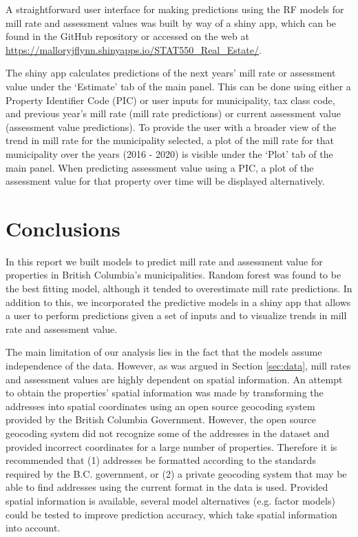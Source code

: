 \documentclass{article}
\begin{document}
A straightforward user interface for making predictions using the RF models for mill rate and assessment values was built by way of a shiny app, which can be found in the GitHub repository \citep{gitrepo} or accessed on the web at {\color{blue} \underline{\url{https://malloryjflynn.shinyapps.io/STAT550_Real_Estate/}}}. 

The shiny app calculates predictions of the next years' mill rate or assessment value under the `Estimate' tab of the main panel.  This can be done using either a Property Identifier Code (PIC) or user inputs for municipality, tax class code, and previous year's mill rate (mill rate predictions) or current assessment value (assessment value predictions).  To provide the user with a broader view of the trend in mill rate for the municipality selected, a plot of the mill rate for that municipality over the years (2016 - 2020) is visible under the `Plot' tab of the main panel.  When predicting assessment value using a PIC, a plot of the assessment value for that property over time will be displayed alternatively.


\section{Conclusions} \label{section:conclusion}

In this report we built models to predict mill rate and assessment value for properties in British Columbia's municipalities. Random forest was found to be the best fitting model, although it tended to overestimate mill rate predictions. In addition to this, we incorporated the predictive models in a shiny app that allows a user to perform predictions given a set of inputs and to visualize trends in mill rate and assessment value.

The main limitation of our analysis lies in the fact that the models assume independence of the data. However, as was argued in Section \ref{sec:data}, mill rates and assessment values are highly dependent on spatial information. An attempt to obtain the properties' spatial information was made by transforming the addresses into spatial coordinates using an open source geocoding system provided by the British Columbia Government. However, the open source geocoding system did not recognize some of the addresses in the dataset and provided incorrect coordinates for a large number of properties.  Therefore it is recommended that (1) addresses be formatted according to the standards required by the B.C. government, or (2) a private geocoding system that may be able to find addresses using the current format in the data is used. Provided spatial information is available, several model alternatives (e.g. factor models) could be tested to improve prediction accuracy, which take spatial information into account.
\end{document}
